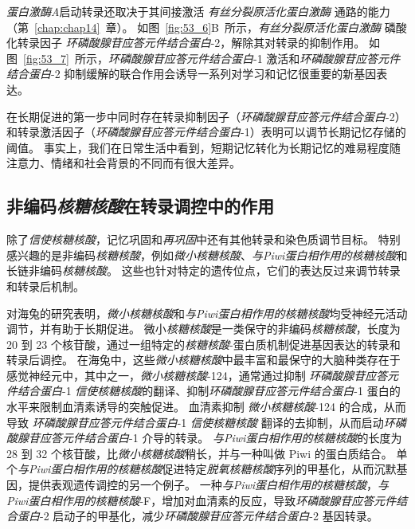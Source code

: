 \textit{蛋白激酶A}启动转录还取决于其间接激活 \textit{有丝分裂原活化蛋白激酶} 通路的能力（第~\ref{chap:chap14}~章）。
如图~\ref{fig:53_6}B~所示，\textit{有丝分裂原活化蛋白激酶} 磷酸化转录因子 \textit{环磷酸腺苷应答元件结合蛋白}-2，解除其对转录的抑制作用。
如图~\ref{fig:53_7}~所示，\textit{环磷酸腺苷应答元件结合蛋白}-1 激活和\textit{环磷酸腺苷应答元件结合蛋白}-2 抑制缓解的联合作用会诱导一系列对学习和记忆很重要的新基因表达。


在长期促进的第一步中同时存在转录抑制因子（\textit{环磷酸腺苷应答元件结合蛋白}-2）和转录激活因子（\textit{环磷酸腺苷应答元件结合蛋白}-1）表明可以调节长期记忆存储的阈值。
事实上，我们在日常生活中看到，短期记忆转化为长期记忆的难易程度随注意力、情绪和社会背景的不同而有很大差异。



\subsection{非编码\textit{核糖核酸}在转录调控中的作用}

除了\textit{信使核糖核酸}，记忆巩固和\textit{再巩固}中还有其他转录和染色质调节目标。
特别感兴趣的是非编码\textit{核糖核酸}，例如\textit{微小核糖核酸}、\textit{与Piwi蛋白相作用的核糖核酸}和长链非编码\textit{核糖核酸}。
这些也针对特定的遗传位点，它们的表达反过来调节转录和转录后机制。


对海兔的研究表明，\textit{微小核糖核酸}和\textit{与Piwi蛋白相作用的核糖核酸}均受神经元活动调节，并有助于长期促进。
微小\textit{核糖核酸}是一类保守的非编码\textit{核糖核酸}，长度为 20 到 23 个核苷酸，通过一组特定的\textit{核糖核酸}-蛋白质机制促进基因表达的转录和转录后调控。
在海兔中，这些\textit{微小核糖核酸}中最丰富和最保守的大脑种类存在于感觉神经元中，其中之一，\textit{微小核糖核酸}-124，通常通过抑制 \textit{环磷酸腺苷应答元件结合蛋白}-1 \textit{信使核糖核酸}的翻译、抑制\textit{环磷酸腺苷应答元件结合蛋白}-1 蛋白的水平来限制血清素诱导的突触促进。
血清素抑制 \textit{微小核糖核酸}-124 的合成，从而导致 \textit{环磷酸腺苷应答元件结合蛋白}-1 \textit{信使核糖核酸} 翻译的去抑制，从而启动\textit{环磷酸腺苷应答元件结合蛋白}-1 介导的转录。
\textit{与Piwi蛋白相作用的核糖核酸}的长度为 28 到 32 个核苷酸，比\textit{微小核糖核酸}稍长，并与一种叫做 Piwi 的蛋白质结合。
单个\textit{与Piwi蛋白相作用的核糖核酸}促进特定\textit{脱氧核糖核酸}序列的甲基化，从而沉默基因，提供表观遗传调控的另一个例子。
一种\textit{与Piwi蛋白相作用的核糖核酸}，\textit{与Piwi蛋白相作用的核糖核酸}-F，增加对血清素的反应，导致\textit{环磷酸腺苷应答元件结合蛋白}-2 启动子的甲基化，减少\textit{环磷酸腺苷应答元件结合蛋白}-2 基因转录。


